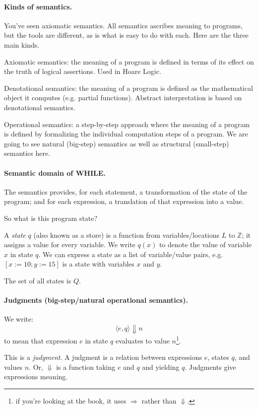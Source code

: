 \documentclass[11pt]{article}
\begin{document}
\paragraph{Kinds of semantics.} You've seen axiomatic semantics. All semantics ascribes meaning to
programs, but the tools are different, as is what is easy to do with each. Here are the three main kinds.

Axiomatic semantics: the meaning of a program is defined in terms of
its effect on the truth of logical assertions.  Used in Hoare Logic.

Denotational semantics: the meaning of a program is defined as the
mathematical object it computes (e.g. partial functions). Abstract
interpretation is based on denotational semantics.

Operational semantics: a step-by-step approach where the meaning of a program
is defined by formalizing the individual computation steps of a program.
We are going to see natural (big-step) semantics as well as structural
(small-step) semantics here.

\paragraph{Semantic domain of WHILE.} The semantics provides, for each statement, a
transformation of the state of the program; and for each expression, a translation of
that expression into a value.

So what is this program state?

A \emph{state} $q$ (also known as a store) is a function from variables/locations $L$ to $\mathbb{Z}$;
it assigns a value for every variable. We write $q(x)$ to denote the value of variable $x$ in state $q$.
We can express a state as a list of variable/value pairs, e.g. $[x := 10; y := 15]$ is a state with variables
$x$ and $y$.

The set of all states is $Q$.

\paragraph{Judgments (big-step/natural operational semantics).} We write:
\[ \langle e, q \rangle \Downarrow n \]
to mean that expression $e$ in state $q$ evaluates to value $n$\footnote{if you're looking at the book, it uses $\Rightarrow$ rather than $\Downarrow$.}.

This is a \emph{judgment}. A judgment is a relation between expressions $e$, states $q$, and values $n$. Or, $\Downarrow$ is a function taking $e$ and $q$ and yielding $q$. Judgments give expressions meaning.
\end{document}
